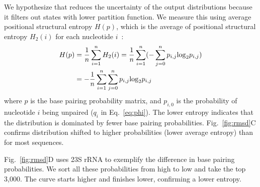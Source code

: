 We hypothesize that \linearpartition reduces the uncertainty of the output  distributions %
because it filters out states with lower partition function.
We measure this using average positional structural entropy $H(p)$, %
which is the average of positional structural entropy $H_2(i)$ for each nucleotide $i$~\cite{Huynen+:1997,Garcia-Martin+Clote:2015}:
\vspace{-0.2cm}
\begin{equation}
  \vspace{-0.3cm}
\begin{split}
H(p) &= \frac{1}{n}\sum_{i=1}^{n}{H_2(i)} =\frac{1}{n}\sum_{i=1}^{n}({-\sum_{j=0}^{n}p_{i,j}\mathrm{log}_{2}p_{i,j}}) \\
		&=-\frac{1}{n}\sum_{i=1}^{n}{\sum_{j=0}^{n}p_{i,j}\mathrm{log}_{2}p_{i,j}} \notag
\end{split}
\end{equation}
where $p$ is the base pairing probability matrix,
and $p_{i,0}$ is the probability of nucleotide $i$ being unpaired ($q_i$ in Eq.~\ref{eq:phi}).
The lower entropy indicates that the distribution is dominated by fewer base pairing probabilities.
Fig.~\ref{fig:rmsd}C confirms \linearpartition distribution shifted to higher probabilities (lower average entropy) than \rnafold for most sequences.

Fig.~\ref{fig:rmsd}D uses \ecoli 23S rRNA to exemplify the difference in base pairing probabilities.
We sort all these probabilities from high to low and take the top 3,000.
The \linearpartition curve starts higher and finishes lower, confirming a lower entropy. %



